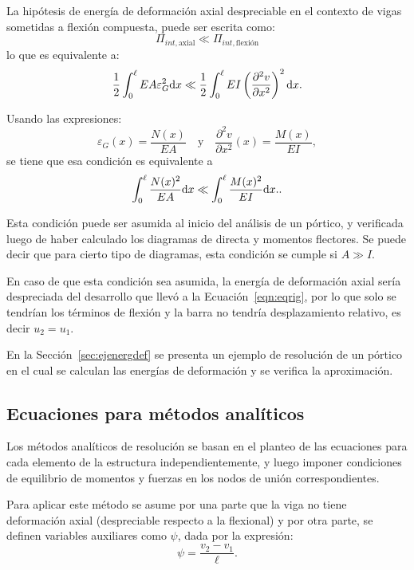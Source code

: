 La hipótesis de energía de deformación axial despreciable en el contexto de vigas sometidas a flexión compuesta, puede ser escrita como:
%
\begin{equation}
	\Pi_{int,\text{axial}} \ll \Pi_{int,\text{flexión}}
\end{equation}
%
lo que es equivalente a:%
%
\begin{equation}
	\frac{1}{2} \int_{0}^{\ell} E A  \varepsilon_G^2 {\text{d}} x \ll \frac{1}{2} \int_{0}^{\ell} EI \left( \frac{\partial^2 v}{\partial x^2}\right)^2 {\text{d}} x.
\end{equation}

Usando las expresiones: 
\begin{equation}
	\varepsilon_G(x) = \frac{	N (x) }{E A}
	\quad
	\text{y}
	\quad
	\frac{\partial^2 v}{\partial x^2}(x) = \frac{	M (x) }{E I} ,
\end{equation}
se tiene que esa condición es equivalente a 
%
\begin{equation}
	\int_{0}^{\ell} \frac{	N (x)^2 }{E A} {\text{d}} x \ll \int_{0}^{\ell} \frac{	M (x)^2 }{E I}  {\text{d}} x..
\end{equation}


Esta condición puede ser asumida al inicio del análisis de un pórtico, y verificada luego de haber calculado los diagramas de directa y momentos flectores. %
%
Se puede decir que para cierto tipo de diagramas, esta condición se cumple si $A \gg I$.

En caso de que esta condición sea asumida, la energía de deformación axial sería despreciada del desarrollo que llevó a la Ecuación~\eqref{eqn:eqrig}, por lo que solo se tendrían los términos de flexión y la barra no tendría desplazamiento relativo, es decir $u_2=u_1$.

En la Sección~\ref{sec:ejenergdef} se presenta un ejemplo de resolución de un pórtico en el cual se calculan las energías de deformación y se verifica la aproximación.


\subsection{Ecuaciones para métodos analíticos}

Los métodos analíticos de resolución se basan en el planteo de las ecuaciones para cada elemento de la estructura independientemente, y luego imponer condiciones de equilibrio de momentos y fuerzas en los nodos de unión correspondientes. %

Para aplicar este método se asume por una parte que la viga no tiene deformación axial (despreciable respecto a la flexional) y por otra parte, se definen variables auxiliares como $\psi$, dada por la expresión:
%
\begin{equation}
  \psi = \frac{v_2 - v_1}{\ell}.
\end{equation}
%

